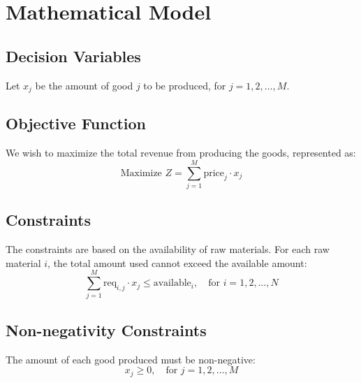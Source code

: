 \documentclass{article}
\begin{document}
\section*{Mathematical Model}

\subsection*{Decision Variables}
Let \( x_j \) be the amount of good \( j \) to be produced, for \( j = 1, 2, \ldots, M \).

\subsection*{Objective Function}
We wish to maximize the total revenue from producing the goods, represented as:
\[
\text{Maximize } Z = \sum_{j=1}^{M} \text{price}_j \cdot x_j
\]

\subsection*{Constraints}
The constraints are based on the availability of raw materials. For each raw material \( i \), the total amount used cannot exceed the available amount:
\[
\sum_{j=1}^{M} \text{req}_{i,j} \cdot x_j \leq \text{available}_i, \quad \text{for } i = 1, 2, \ldots, N
\]

\subsection*{Non-negativity Constraints}
The amount of each good produced must be non-negative:
\[
x_j \geq 0, \quad \text{for } j = 1, 2, \ldots, M
\]
\end{document}
